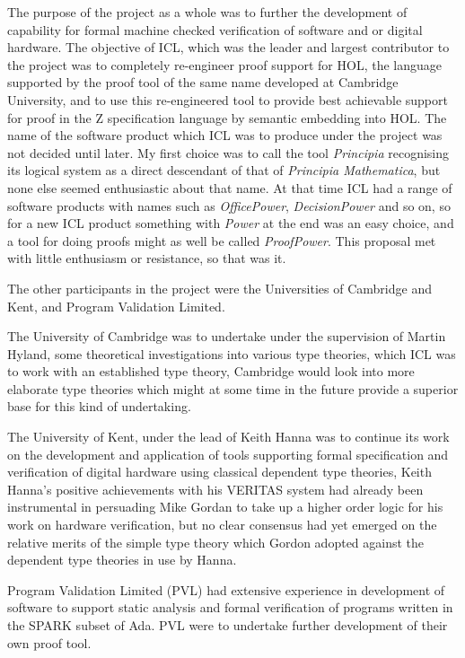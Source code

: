\documentclass[10pt,titlepage]{book}
\begin{document}
The purpose of the project as a whole was to further the development of capability for formal machine checked verification of software and or digital hardware.
The objective of ICL, which was the leader and largest contributor to the project was to completely re-engineer proof support for HOL, the language supported by the proof tool of the same name developed at Cambridge University, and to use this re-engineered tool to provide best achievable support for proof in the Z specification language by semantic embedding into HOL.
The name of the software product which ICL was to produce under the project was not decided until later.
My first choice was to call the tool {\it Principia} recognising its logical system as a direct descendant of that of {\it Principia Mathematica}\cite{whitehead10}, but none else seemed enthusiastic about that name.
At that time ICL had a range of software products with names such as {\it OfficePower}, {\it DecisionPower} and so on, so for a new ICL product something with {\it Power} at the end was an easy choice, and a tool for doing proofs might as well be called {\it ProofPower}.
This proposal met with little enthusiasm or resistance, so that was it.

The other participants in the project were the Universities of Cambridge and Kent, and Program Validation Limited.

The University of Cambridge was to undertake under the supervision of Martin Hyland, some theoretical investigations into various type theories, which ICL was to work with an established type theory, Cambridge would look into more elaborate type theories which might at some time in the future provide a superior base for this kind of undertaking.

The University of Kent, under the lead of Keith Hanna was to continue its work on the development and application of tools supporting formal specification and verification of digital hardware using classical dependent type theories,
Keith Hanna's positive achievements with his VERITAS system had already been instrumental in persuading Mike Gordan to take up a higher order logic for his work on hardware verification, but no clear consensus had yet emerged on the relative merits of the simple type theory which Gordon adopted against the dependent type theories in use by Hanna.

Program Validation Limited (PVL) had extensive experience in development of software to support static analysis and formal verification of programs written in the SPARK subset of Ada.
PVL were to undertake further development of their own proof tool.
\end{document}
